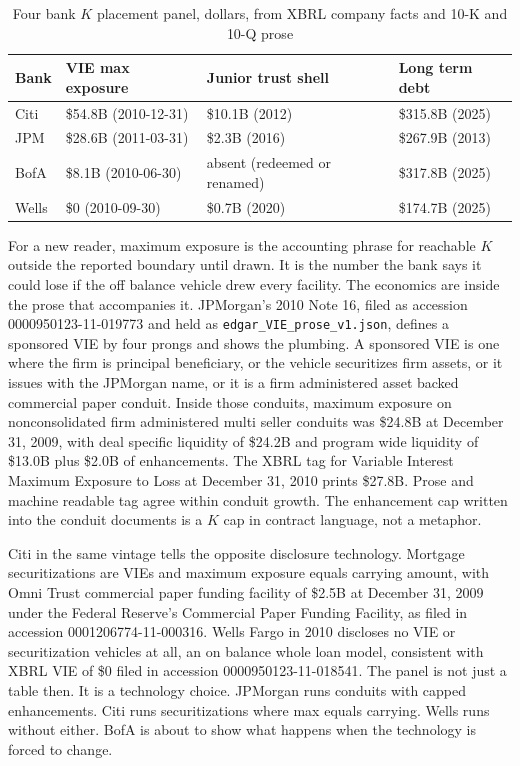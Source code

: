 \begin{table}[h]
\centering
\small
\caption{Four bank $K$ placement panel, dollars, from XBRL company facts and 10-K and 10-Q prose}
\label{tab:entity-kpanel}
\begin{tabular}{p{2.0cm} p{2.9cm} p{2.9cm} p{2.9cm}}
\toprule
Bank & VIE max exposure & Junior trust shell & Long term debt \\
\midrule
Citi & \$54.8B (2010-12-31) & \$10.1B (2012) & \$315.8B (2025) \\
JPM & \$28.6B (2011-03-31) & \$2.3B (2016) & \$267.9B (2013) \\
BofA & \$8.1B (2010-06-30) & absent (redeemed or renamed) & \$317.8B (2025) \\
Wells & \$0 (2010-09-30) & \$0.7B (2020) & \$174.7B (2025) \\
\bottomrule
\end{tabular}
\end{table}

For a new reader, maximum exposure is the accounting phrase for reachable $K$ outside the reported boundary until drawn. It is the number the bank says it could lose if the off balance vehicle drew every facility. The economics are inside the prose that accompanies it. JPMorgan's 2010 Note 16, filed as accession 0000950123-11-019773 and held as \texttt{edgar\_VIE\_prose\_v1.json}, defines a sponsored VIE by four prongs and shows the plumbing. A sponsored VIE is one where the firm is principal beneficiary, or the vehicle securitizes firm assets, or it issues with the JPMorgan name, or it is a firm administered asset backed commercial paper conduit. Inside those conduits, maximum exposure on nonconsolidated firm administered multi seller conduits was \$24.8B at December 31, 2009, with deal specific liquidity of \$24.2B and program wide liquidity of \$13.0B plus \$2.0B of enhancements. The XBRL tag for Variable Interest Maximum Exposure to Loss at December 31, 2010 prints \$27.8B. Prose and machine readable tag agree within conduit growth. The enhancement cap written into the conduit documents is a $K$ cap in contract language, not a metaphor.

Citi in the same vintage tells the opposite disclosure technology. Mortgage securitizations are VIEs and maximum exposure equals carrying amount, with Omni Trust commercial paper funding facility of \$2.5B at December 31, 2009 under the Federal Reserve's Commercial Paper Funding Facility, as filed in accession 0001206774-11-000316. Wells Fargo in 2010 discloses no VIE or securitization vehicles at all, an on balance whole loan model, consistent with XBRL VIE of \$0 filed in accession 0000950123-11-018541. The panel is not just a table then. It is a technology choice. JPMorgan runs conduits with capped enhancements. Citi runs securitizations where max equals carrying. Wells runs without either. BofA is about to show what happens when the technology is forced to change.

